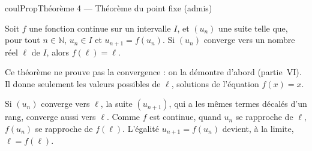 \documentclass[11pt,a4paper]{article}
\makeatletter
\newcommand{\N}{\mathbb{N}}
\newcommand{\lycee@repere}[4]{%
  \draw[grille,step=1] (#1,#2) grid (#3,#4);
  \draw[-{Stealth[length=2mm]},thick] (#1,0)--({#3+0.4},0) node[below left=-1pt]{$x$};
  \draw[-{Stealth[length=2mm]},thick] (0,#2)--(0,{#4+0.4}) node[below left=-1pt]{$y$};
  \node[below left,font=\scriptsize,inner sep=1.5pt] at (0,0) {$0$};}
\providecommand{\repere}{\lycee@repere}%
\providecommand{\Cf}{\mathcal{C}\sb{f}}%
\newcounter{lycee@signet}
\newcommand{\signet}[3][]{\stepcounter{lycee@signet}%
  \edef\lycee@dest{\if\relax\detokenize{#1}\relax
    signet.\arabic{lycee@signet}\else#1\fi}%
  \hypertarget{\lycee@dest}{}\bookmark[level=#2,dest=\lycee@dest]{#3}}
\newenvironment{proprietebox}[1][Propriété]%
  {\begin{boitecours}[phantom={\signet{2}{#1}}]{coulProp}{#1}}{\end{boitecours}}
\makeatother
\begin{document}
\begin{proprietebox}[Théorème 4 --- Théorème du point fixe (admis)]
\begin{minipage}[c]{0.58\linewidth}\raggedright
Soit $f$ une fonction continue sur un intervalle $I$, et $(u_{n})$ une suite telle que,
pour tout $n\in\N$, $u_{n}\in I$ et $u_{n+1}=f(u_{n})$. Si $(u_{n})$ converge vers un
nombre réel $\ell$ de $I$, alors $f(\ell)=\ell$.

\smallskip
Ce théorème ne prouve pas la convergence : on la démontre d'abord (partie~VI). Il donne
seulement les valeurs possibles de $\ell$, solutions de l'équation $f(x)=x$.
\end{minipage}\hfill
\begin{minipage}[c]{0.38\linewidth}\centering
{}
\end{minipage}
\end{proprietebox}

\begin{remarquebox}[Pourquoi ?]
Si $(u_{n})$ converge vers $\ell$, la suite $(u_{n+1})$, qui a les mêmes termes décalés
d'un rang, converge aussi vers $\ell$. Comme $f$ est continue, quand $u_{n}$ se
rapproche de $\ell$, $f(u_{n})$ se rapproche de $f(\ell)$. L'égalité $u_{n+1}=f(u_{n})$
devient, à la limite, $\ell=f(\ell)$.
\end{remarquebox}
\end{document}
